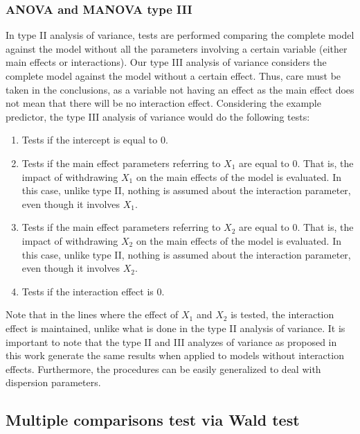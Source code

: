\documentclass[AMA,STIX1COL]{WileyNJD-v2}
\begin{document}
\subsubsection{ANOVA and MANOVA type III}

In type II analysis of variance, tests are performed comparing the complete model against the model without all the parameters involving a certain variable (either main effects or interactions). Our type III analysis of variance considers the complete model against the model without a certain effect. Thus, care must be taken in the conclusions, as a variable not having an effect as the main effect does not mean that there will be no interaction effect. Considering the example predictor, the type III analysis of variance would do the following tests:

\begin{enumerate}
  \item Tests if the intercept is equal to 0.
  
  \item Tests if the main effect parameters referring to $X_1$ are equal to 0. That is, the impact of withdrawing $X_1$ on the main effects of the model is evaluated. In this case, unlike type II, nothing is assumed about the interaction parameter, even though it involves $X_1$.
  
  \item Tests if the main effect parameters referring to $X_2$ are equal to 0. That is, the impact of withdrawing $X_2$ on the main effects of the model is evaluated. In this case, unlike type II, nothing is assumed about the interaction parameter, even though it involves $X_2$.
  
  \item Tests if the interaction effect is 0.
\end{enumerate}

Note that in the lines where the effect of $X_1$ and $X_2$ is tested, the interaction effect is maintained, unlike what is done in the type II analysis of variance. It is important to note that the type II and III analyzes of variance as proposed in this work generate the same results when applied to models without interaction effects. Furthermore, the procedures can be easily generalized to deal with dispersion parameters.

\subsection{Multiple comparisons test via Wald test}
\end{document}

